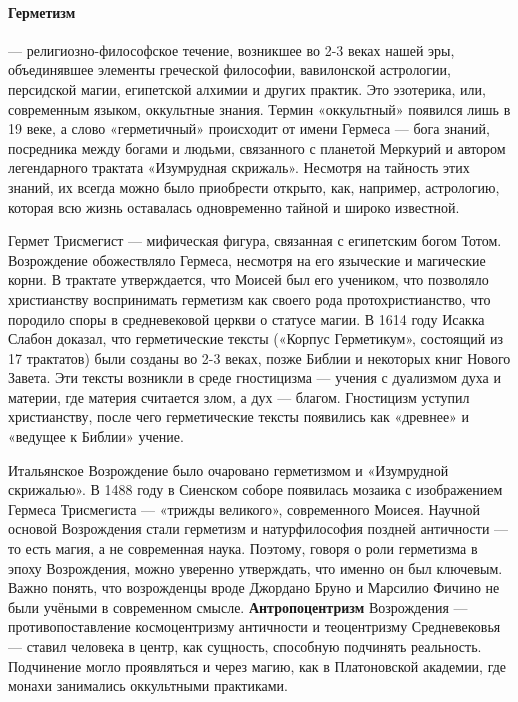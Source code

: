 \paragraph{Герметизм} --- религиозно-философское течение, возникшее во 2-3 веках нашей эры, объединявшее элементы греческой философии, вавилонской астрологии, персидской магии, египетской алхимии и других практик. Это эзотерика, или, современным языком, оккультные знания. Термин «оккультный» появился лишь в 19 веке, а слово «герметичный» происходит от имени Гермеса --- бога знаний, посредника между богами и людьми, связанного с планетой Меркурий и автором легендарного трактата «Изумрудная скрижаль». Несмотря на тайность этих знаний, их всегда можно было приобрести открыто, как, например, астрологию, которая всю жизнь оставалась одновременно тайной и широко известной.

Гермет Трисмегист --- мифическая фигура, связанная с египетским богом Тотом. Возрождение обожествляло Гермеса, несмотря на его языческие и магические корни. В трактате утверждается, что Моисей был его учеником, что позволяло христианству воспринимать герметизм как своего рода протохристианство, что породило споры в средневековой церкви о статусе магии.
В 1614 году Исакка Слабон доказал, что герметические тексты («Корпус Герметикум», состоящий из 17 трактатов) были созданы во 2-3 веках, позже Библии и некоторых книг Нового Завета. Эти тексты возникли в среде гностицизма --- учения с дуализмом духа и материи, где материя считается злом, а дух --- благом. Гностицизм уступил христианству, после чего герметические тексты появились как «древнее» и «ведущее к Библии» учение.

Итальянское Возрождение было очаровано герметизмом и «Изумрудной скрижалью». В 1488 году в Сиенском соборе появилась мозаика с изображением Гермеса Трисмегиста --- «трижды великого», современного Моисея. Научной основой Возрождения стали герметизм и натурфилософия поздней античности --- то есть магия, а не современная наука. Поэтому, говоря о роли герметизма в эпоху Возрождения, можно уверенно утверждать, что именно он был ключевым. Важно понять, что возрожденцы вроде Джордано Бруно и Марсилио Фичино не были учёными в современном смысле. \textbf{Антропоцентризм} Возрождения --- противопоставление космоцентризму античности и теоцентризму Средневековья --- ставил человека в центр, как сущность, способную подчинять реальность. Подчинение могло проявляться и через магию, как в Платоновской академии, где монахи занимались оккультными практиками.

